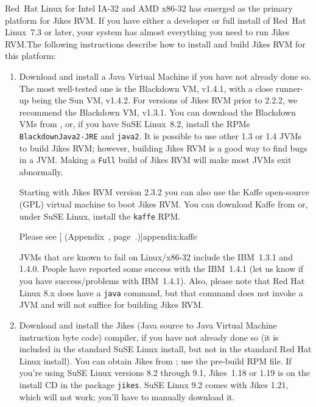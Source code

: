Red~Hat\TMboth{} Linux\Rboth{} for Intel\Rboth{} IA-32 and AMD\Rboth{} x86-32 has emerged as the 
primary platform for Jikes\TMweb{} RVM.\@ 
If you have either a developer or full install of Red~Hat
Linux~7.3 or later, your system has almost everything you need
to run Jikes RVM.\@  The following instructions describe how to install
and build Jikes RVM for this platform:
\begin{enumerate}

%
%
%
\item Download and install a Java\TMweb{} Virtual Machine if you have not
already done so.  The most well-tested one is the Blackdown VM,
v1.4.1, with a close runner-up being the Sun VM, v1.4.2.
For versions of Jikes RVM prior to 2.2.2, we recommend
the Blackdown VM, v1.3.1.  You can download the Blackdown VMs from 
\xlink{{\tt \BlackdownURL}}{\BlackdownURL}, or, if you have SuSE
Linux~8.2, install the RPMs {\tt Black\-downJa\-va2-JRE} and {\tt java2}. 
It is possible to use other 1.3 or 1.4 JVMs to build Jikes RVM;
however, building Jikes RVM is a good way to find bugs in a JVM.\@
Making a {\tt Full} build of Jikes RVM will make most JVMs exit abnormally.

%
Starting with Jikes RVM version 2.3.2 you can also use the Kaffe
open-source (GPL) virtual machine to boot Jikes RVM.  You can download
Kaffe from \xlink{{\tt \KaffeURL}}{\KaffeURL} or, under SuSE Linux, install the 
{\tt kaffe} RPM.

Please see 
[ (Appendix~\Ref, page~\Pageref.)]{appendix:kaffe}


%
JVMs that are known to fail on Linux/x86-32 include the IBM\Rweb{}~1.3.1 and
1.4.0.  People have reported some success with the IBM~1.4.1 (let us
know if you have success/problems with IBM~1.4.1). Also, please note
that Red Hat Linux 8.x does have a {\tt java} command, but that command does not invoke a
JVM and will not suffice for building Jikes RVM.\@

%
\item Download and install the Jikes (Java source to Java Virtual
  Machine instruction byte code)
compiler, if you have not already 
done so (it is included in the standard SuSE Linux install, but not in
the standard Red Hat Linux install).  You can 
obtain Jikes from ;
use the pre-build RPM file.
If you're using SuSE Linux versions 8.2 through 9.1, Jikes~1.18 or 1.19 is on the install
CD in the package {\tt jikes}.  SuSE Linux 9.2 comes with Jikes 1.21,
which will not work; you'll have to manually download it.  


\end{enumerate}
